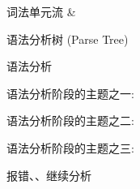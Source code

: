 
\begin{frame}{}
  \begin{center}
     词法单元流 \& 

    \vspace{0.50cm}

    \vspace{0.30cm}
     语法分析树 (Parse Tree)
  \end{center}
\end{frame}

\begin{frame}{}
  \begin{center}
    语法分析

  \end{center}
\end{frame}

\begin{frame}{}
  \begin{center}
    语法分析阶段的主题之一: 

  \end{center}
\end{frame}

\begin{frame}{}
  \begin{center}
    语法分析阶段的主题之二: 

  \end{center}
\end{frame}

\begin{frame}{}
  \begin{center}
    语法分析阶段的主题之三: 


    报错、、继续分析
  \end{center}
\end{frame}
